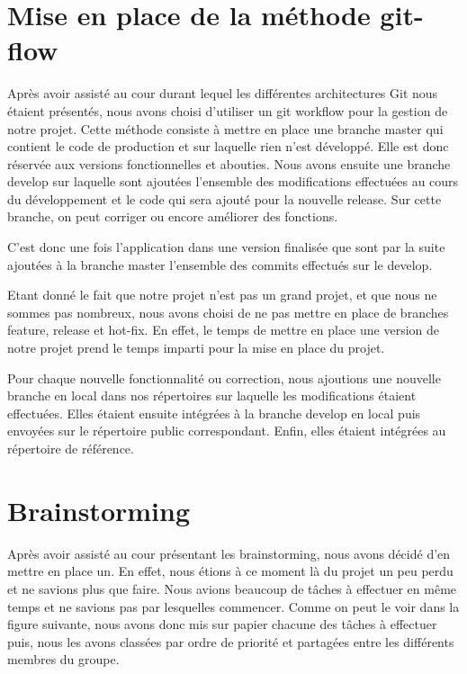 \documentclass{report}
\begin{document}
\section{Mise en place de la méthode git-flow}
\hspace{0.5cm}Après avoir assisté au cour durant lequel les différentes architectures Git nous étaient présentés, nous avons choisi d'utiliser un git workflow pour la gestion de notre projet. Cette méthode consiste à mettre en place une branche master qui contient le code de production et sur laquelle rien n'est développé. Elle est donc réservée aux versions fonctionnelles et abouties.
Nous avons ensuite une branche develop sur laquelle sont ajoutées l'ensemble des modifications effectuées au cours du développement et le code qui sera ajouté pour la nouvelle release. Sur cette branche, on peut corriger ou encore améliorer des fonctions. \par
C'est donc une fois l'application dans une version finalisée que sont par la suite ajoutées à la branche master l'ensemble des commits effectués sur le develop.\par
Etant donné le fait que notre projet n'est pas un grand projet, et que nous ne sommes pas nombreux, nous avons choisi de ne pas mettre en place de branches feature, release et hot-fix. En effet, le temps de mettre en place une version de notre projet prend le temps imparti pour la mise en place du projet.\par
Pour chaque nouvelle fonctionnalité ou correction, nous ajoutions une nouvelle branche en local dans nos répertoires sur laquelle les modifications étaient effectuées. Elles étaient ensuite intégrées à la branche develop en local puis envoyées sur le répertoire public correspondant. Enfin, elles étaient intégrées au répertoire de référence.\par


\section{Brainstorming}
\hspace{0.5cm}Après avoir assisté au cour présentant les brainstorming, nous avons décidé d'en mettre en place un. En effet, nous étions à ce moment là du projet un peu perdu et ne savions plus que faire. Nous avions beaucoup de tâches à effectuer en même temps et ne savions pas par lesquelles commencer. Comme on peut le voir dans la figure suivante, nous avons donc mis sur papier chacune des tâches à effectuer puis, nous les avons classées par ordre de priorité et partagées entre les différents membres du groupe. \par
\end{document}
